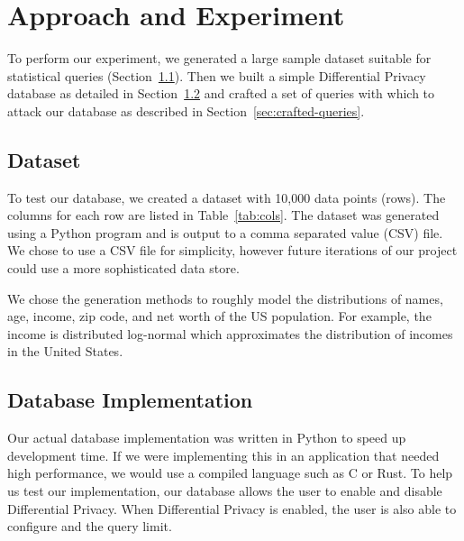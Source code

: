 \documentclass[conference,11pt]{IEEEtran}
\begin{document}
\section{Approach and Experiment}\label{sec:approach}
To perform our experiment, we generated a large sample dataset suitable for
statistical queries (Section~\ref{sec:dataset}). Then we built a simple
Differential Privacy database as detailed in Section~\ref{sec:db-impl} and
crafted a set of queries with which to attack our database as described in
Section~\ref{sec:crafted-queries}.

\subsection{Dataset}\label{sec:dataset}
To test our database, we created a dataset with 10,000 data points (rows). The
columns for each row are listed in Table~\ref{tab:cols}.  The dataset was
generated using a Python program and is output to a comma separated value (CSV)
file. We chose to use a CSV file for simplicity, however future iterations of
our project could use a more sophisticated data store.

We chose the generation methods to roughly model the distributions of names,
age, income, zip code, and net worth of the US population. For example, the
income is distributed log-normal which approximates the distribution of incomes
in the United States.

\subsection{Database Implementation}\label{sec:db-impl}
Our actual database implementation was written in Python to speed up development
time. If we were implementing this in an application that needed high
performance, we would use a compiled language such as C or Rust.  To help us
test our implementation, our database allows the user to enable and disable
Differential Privacy. When Differential Privacy is enabled, the user is also
able to configure {\textepsilon} and the query limit.
\end{document}
